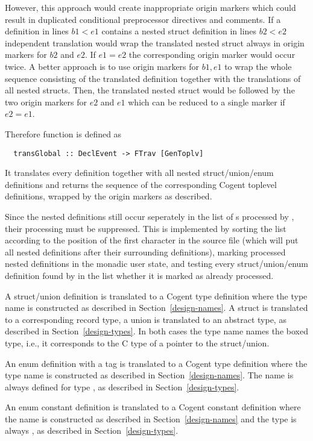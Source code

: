 However, this approach would create inappropriate origin markers which could result in duplicated conditional preprocessor
directives and comments. If a definition in lines $b1 < e1$ contains a nested struct definition in lines $b2 < e2$
independent translation would wrap the translated nested struct always in origin markers for $b2$ and $e2$. If $e1 = e2$
the corresponding origin marker would occur twice. A better approach is to use origin markers for $b1, e1$ to wrap the 
whole sequence consisting of the translated definition together with the translations of all nested structs. Then, the translated
nested struct would be followed by the two origin markers for $e2$ and $e1$ which can be reduced to a single marker if
$e2 = e1$.

Therefore function  is defined as
\begin{verbatim}
  transGlobal :: DeclEvent -> FTrav [GenToplv]
\end{verbatim}
It translates every definition together with all nested struct/union/enum definitions and returns the sequence of 
the corresponding Cogent toplevel definitions, wrapped by the origin markers as described.

Since the nested definitions still occur seperately in the list of s processed by , their processing
must be suppressed. This is implemented by sorting the list according to the position of the first character in the source file
(which will put all nested definitions after their surrounding definitions), marking processed nested definitions in the 
monadic user state, and testing every struct/union/enum definition found by  in the  list 
whether it is marked as already processed.

A struct/union definition is translated to a Cogent type definition where the type name is constructed as described 
in Section~\ref{design-names}. A struct is translated to a corresponding record type, a union is translated to an 
abstract type, as described in Section~\ref{design-types}.
In both cases the type name names the boxed type, i.e., it corresponds to the C type of a pointer to the struct/union.

An enum definition with a tag is translated to a Cogent type definition where the type name is constructed as described 
in Section~\ref{design-names}. The name is always defined for type , as described in Section~\ref{design-types}.

An enum constant definition is translated to a Cogent constant definition where the name is constructed as described 
in Section~\ref{design-names} and the type is always , as described in Section~\ref{design-types}.

